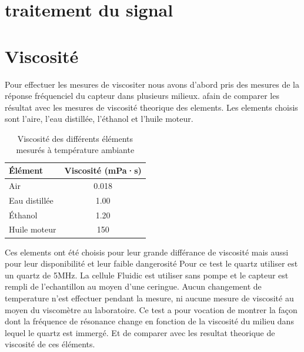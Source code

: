 \section{traitement du signal}

\newpage

\section{Viscosité}
Pour effectuer les mesures de viscositer nous avons d'abord pris des mesures de la réponse fréquenciel du capteur dans plusieurs milieux.
afain de comparer les résultat avec les mesures de viscosité theorique des elements. Les elements choisis sont l'aire, l'eau distillée, l'éthanol et l'huile moteur.
\begin{table}[H]
    \centering
    \begin{tabular}{|l|c|}
        \hline
        \textbf{Élément}      & \textbf{Viscosité (mPa·s)} \\
        \hline
        Air                  & 0.018 \\
        Eau distillée        & 1.00  \\
        Éthanol              & 1.20  \\
        Huile moteur         & 150   \\
        \hline
    \end{tabular}
    \caption{Viscosité des différents éléments mesurés à température ambiante}
    \label{tab:viscosite_elements}
\end{table}
Ces elements ont été choisis pour leur grande différance de viscosité mais aussi pour leur disponibilité et leur faible dangerosité
Pour ce test le quartz utiliser est un quartz de 5MHz. La cellule Fluidic est utiliser sans pompe et le capteur est rempli de l'echantillon au moyen d'une ceringue. 
Aucun changement de temperature n'est effectuer pendant la mesure, ni aucune mesure de viscosité au moyen du viscomètre au laboratoire.
Ce test a pour vocation de montrer la façon dont la fréquence de résonance change en fonction de la viscosité du milieu dans lequel le quartz est immergé. Et de comparer avec les resultat theorique de viscosité de ces éléments.


